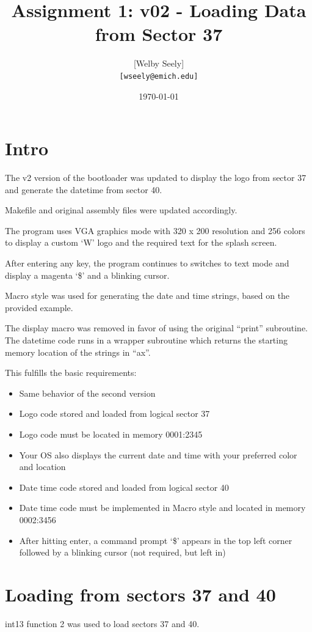 \documentclass{article}
\title{Assignment 1: v02 - Loading Data from Sector 37}
\author{
    [Welby Seely] \\
    \texttt{[wseely@emich.edu]}
}
\date{\today}
\begin{document}
    \maketitle
    \section{Intro}\label{sec:intro}
    The v2 version of the bootloader was updated to display the logo from sector 37 and generate the datetime from sector 40.

    Makefile and original assembly files were updated accordingly.

    The program uses VGA graphics mode with 320 x 200 resolution and 256 colors to display a
    custom `W' logo and the required text for the splash screen.

    After entering any key, the program continues to switches to text mode and display a magenta `\$' and a
    blinking cursor.

    Macro style was used for generating the date and time strings, based on the provided example.

    The display macro was removed in favor of using the original ``print'' subroutine.
     The datetime code runs in a wrapper subroutine which returns the starting memory location of the strings in ``ax''.

    This fulfills the basic requirements:

    \begin{itemize}
        \item Same behavior of the second version
        \item Logo code stored and loaded from logical sector 37
        \item Logo code must be located in memory 0001:2345
        \item Your OS also displays the current date and time with your preferred color and location
        \item Date time code stored and loaded from logical sector 40
        \item Date time code must be implemented in Macro style and located in memory 0002:3456
        \item After hitting enter, a command prompt `\$' appears in the top left corner followed by a blinking cursor (not required, but left in)
    \end{itemize}

    \section{Loading from sectors 37 and 40}\label{sec:reqs}
    int13 function 2 was used to load sectors 37 and 40.
\end{document}
